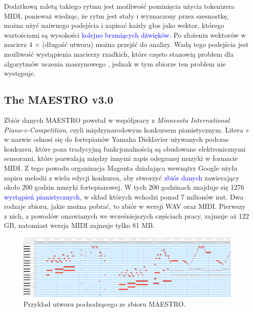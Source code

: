 \documentclass[data-science]{agh-wi} %
\begin{document}
Dodatkową zaletą takiego rytmu jest możliwość pominięcia użycia tokenizera MIDI, ponieważ wiedząc, że rytm jest stały i wyznaczony przez szesnastkę, można użyć naiwnego podejścia i zapisać każdy głos jako wektor, którego wartościami są wysokości \textcolor{blue}{kolejno brzmiących dźwięków.} Po złożeniu wektorów w macierz 4 $\times$ (długość utworu) można przejść do analizy. Wadą tego podejścia jest możliwość wystąpienia macierzy rzadkich, które często stanowią problem dla algorytmów uczenia maszynowego \cite*{sparse_matrix}, jednak w tym zbiorze ten problem nie występuje.

\subsection{The MAESTRO v3.0}
Zbiór danych MAESTRO \cite{maestrov3} powstał w współpracy z \textit{Minnesota International Piano-e-Competition}, czyli międzynarodowym konkursem pianistycznym. Litera \textit{e} w nazwie odnosi się do fortepianów Yamaha Disklavier używanych podczas konkursu, które poza tradycyjną funkcjonalnością są obudowane elektronicznymi sensorami, które pozwalają między innymi zapis odegranej muzyki w formacie MIDI. Z tego powodu organizacja Magenta działająca wewnątrz Google użyła zapisu melodii z wielu edycji konkursu, aby stworzyć \textcolor{blue}{zbiór danych} zawierający około 200 godzin muzyki fortepianowej. W tych 200 godzinach znajduje się 1276 \textcolor{blue}{wystąpień pianistycznych}, w skład których wchodzi ponad 7 milionów nut. Dwa rodzaje zbioru, jakie można pobrać, to zbiór w wersji WAV oraz MIDI. Pierwszy z nich, z powodów omawianych we wcześniejszych częściach pracy, zajmuje aż 122 GB, natomiast wersja MIDI zajmuje tylko 81 MB.
\begin{figure}[ht!]
    \begin{center}
        \includegraphics[width=0.9\linewidth]{./img/maestro_1.png}
    \end{center}
    \caption{{Przykład utworu pochodzącego ze zbioru MAESTRO.}}\label{fig:maestro_midi}
\end{figure}
\end{document}
